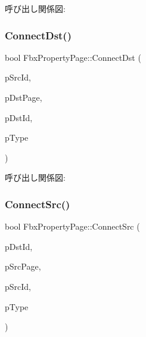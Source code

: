呼び出し関係図\+:
\mbox{\label{class_fbx_property_page_a5ca4dcb646f9d547db779965dca6bd65}} 
\subsubsection{\texorpdfstring{Connect\+Dst()}{ConnectDst()}}
{\footnotesize\ttfamily bool Fbx\+Property\+Page\+::\+Connect\+Dst (\begin{DoxyParamCaption}\item[{\hyperlink{fbxtypes_8h_a088fa96de3b0b3ea69f0f6afef525dfb}{Fbx\+Int}}]{p\+Src\+Id,  }\item[{\hyperlink{class_fbx_property_page}{Fbx\+Property\+Page} $\ast$}]{p\+Dst\+Page,  }\item[{\hyperlink{fbxtypes_8h_a088fa96de3b0b3ea69f0f6afef525dfb}{Fbx\+Int}}]{p\+Dst\+Id,  }\item[{\hyperlink{class_fbx_connection_a3df448a5db356652ab99fd2be2553749}{Fbx\+Connection\+::\+E\+Type}}]{p\+Type }\end{DoxyParamCaption})}

呼び出し関係図\+:
\mbox{\label{class_fbx_property_page_a8a265cf78b10f6255f3c4796b1b10875}} 
\subsubsection{\texorpdfstring{Connect\+Src()}{ConnectSrc()}}
{\footnotesize\ttfamily bool Fbx\+Property\+Page\+::\+Connect\+Src (\begin{DoxyParamCaption}\item[{\hyperlink{fbxtypes_8h_a088fa96de3b0b3ea69f0f6afef525dfb}{Fbx\+Int}}]{p\+Dst\+Id,  }\item[{\hyperlink{class_fbx_property_page}{Fbx\+Property\+Page} $\ast$}]{p\+Src\+Page,  }\item[{\hyperlink{fbxtypes_8h_a088fa96de3b0b3ea69f0f6afef525dfb}{Fbx\+Int}}]{p\+Src\+Id,  }\item[{\hyperlink{class_fbx_connection_a3df448a5db356652ab99fd2be2553749}{Fbx\+Connection\+::\+E\+Type}}]{p\+Type }\end{DoxyParamCaption})}

